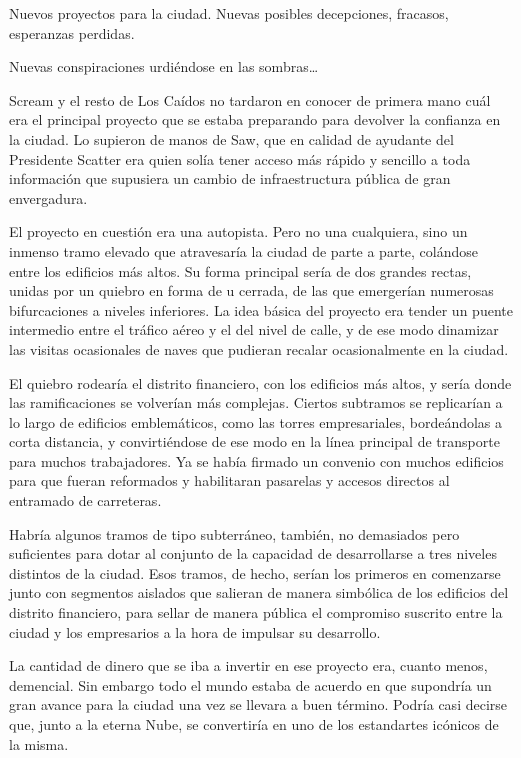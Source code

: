 Nuevos proyectos para la ciudad. Nuevas posibles decepciones, fracasos, esperanzas perdidas.

Nuevas conspiraciones urdiéndose en las sombras\dots

\fancyparbreak
Scream y el resto de Los Caídos no tardaron en conocer de primera mano cuál era el principal proyecto que se estaba preparando para devolver la confianza en la ciudad. Lo supieron de manos de Saw, que en calidad de ayudante del Presidente Scatter era quien solía tener acceso más rápido y sencillo a toda información que supusiera un cambio de infraestructura pública de gran envergadura.

El proyecto en cuestión era una autopista. Pero no una cualquiera, sino un inmenso tramo elevado que atravesaría la ciudad de parte a parte, colándose entre los edificios más altos. Su forma principal sería de dos grandes rectas, unidas por un quiebro en forma de u cerrada, de las que emergerían numerosas bifurcaciones a niveles inferiores. La idea básica del proyecto era tender un puente intermedio entre el tráfico aéreo y el del nivel de calle, y de ese modo dinamizar las visitas ocasionales de naves que pudieran recalar ocasionalmente en la ciudad.

El quiebro rodearía el distrito financiero, con los edificios más altos, y sería donde las ramificaciones se volverían más complejas. Ciertos subtramos se replicarían a lo largo de edificios emblemáticos, como las torres empresariales, bordeándolas a corta distancia, y convirtiéndose de ese modo en la línea principal de transporte para muchos trabajadores. Ya se había firmado un convenio con muchos edificios para que fueran reformados y habilitaran pasarelas y accesos directos al entramado de carreteras.

Habría algunos tramos de tipo subterráneo, también, no demasiados pero suficientes para dotar al conjunto de la capacidad de desarrollarse a tres niveles distintos de la ciudad. Esos tramos, de hecho, serían los primeros en comenzarse junto con segmentos aislados que salieran de manera simbólica de los edificios del distrito financiero, para sellar de manera pública el compromiso suscrito entre la ciudad y los empresarios a la hora de impulsar su desarrollo.

La cantidad de dinero que se iba a invertir en ese proyecto era, cuanto menos, demencial. Sin embargo todo el mundo estaba de acuerdo en que supondría un gran avance para la ciudad una vez se llevara a buen término. Podría casi decirse que, junto a la eterna Nube, se convertiría en uno de los estandartes icónicos de la misma.

